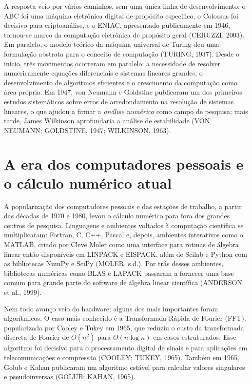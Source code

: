 \documentclass[12pt,a4paper,oneside]{report}
\begin{document}
A resposta veio por vários caminhos, sem uma única linha de desenvolvimento: o ABC foi uma máquina eletrônica digital de propósito específico, o Colossus foi decisivo para criptoanálise, e o ENIAC, apresentado publicamente em 1946, tornou-se marco da computação eletrônica de propósito geral (CERUZZI, 2003). Em paralelo, o modelo teórico da máquina universal de Turing deu uma formulação abstrata para o conceito de computação (TURING, 1937). Desde o início, três movimentos ocorreram em paralelo: a necessidade de resolver numericamente equações diferenciais e sistemas lineares grandes, o desenvolvimento de algoritmos eficientes e o crescimento da computação como área própria. Em 1947, von Neumann e Goldstine publicaram um dos primeiros estudos sistemáticos sobre erros de arredondamento na resolução de sistemas lineares, o que ajudou a firmar a \emph{análise numérica} como campo de pesquisa; mais tarde, James Wilkinson aprofundaria a análise de estabilidade (VON NEUMANN; GOLDSTINE, 1947; WILKINSON, 1963).

\section{A era dos computadores pessoais e o cálculo numérico atual}

A popularização dos computadores pessoais e das estações de trabalho, a partir das décadas de
1970 e 1980, levou o cálculo numérico para fora dos grandes centros de pesquisa. Linguagens e
ambientes voltados à computação científica se multiplicaram: Fortran, C, C++, Pascal e,
depois, ambientes interativos como o MATLAB, criado por Cleve Moler como uma interface para
rotinas de álgebra linear então disponíveis em LINPACK e EISPACK, além de Scilab e Python com
as bibliotecas NumPy e SciPy (MOLER, s.d.). Por trás desses ambientes, bibliotecas numéricas
como BLAS e LAPACK passaram a fornecer uma base comum para grande parte do software de álgebra
linear científica (ANDERSON et al., 1999).

Nem todo avanço veio do hardware; alguns dos mais importantes foram algorítmicos. O caso mais conhecido é a Transformada Rápida de Fourier (FFT), popularizada por Cooley e Tukey em 1965, que reduziu o custo da transformada discreta de Fourier de $O(n^2)$ para $O(n\log n)$ em casos estruturados. Esse algoritmo foi decisivo para o processamento digital de sinais e para aplicações em telecomunicações e compressão (COOLEY; TUKEY, 1965). Também em 1965, Golub e Kahan publicaram um algoritmo estável para calcular valores singulares e pseudoinversas (GOLUB; KAHAN, 1965).
\end{document}
